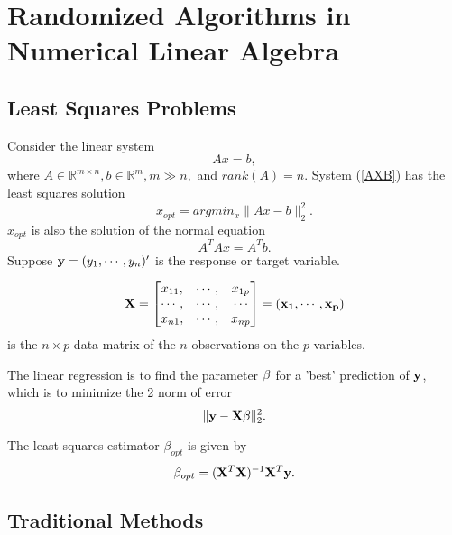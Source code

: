 \chapter{Randomized Algorithms in Numerical Linear Algebra}

\section{Least Squares Problems}
Consider the linear system
\begin{equation}\label{AXB}
A x =b ,
\end{equation}
where $A \in \mathbb{R}^{m \times n}, b \in \mathbb{R}^{m}, m \gg n, $  and $rank(A) = n$.
System (\ref{AXB}) has the least squares solution
\begin{equation}\label{OPT}
x_{opt} = argmin_{x} \| Ax -b\|_2^2 .
\end{equation}
$x_{opt}$ is also the solution of the normal equation
\begin{equation}\label{NOR}
A^T A x = A^T b.
\end{equation}
Suppose $\bold{y} = (y_1,\cdots,y_n)'$  is the response or target variable.

$$\bold{X} = \begin{bmatrix} x_{11} ,&\cdots,& x_{1p}\\
                                                \cdots,&\cdots,&\cdots \\
                                                x_{n1},&\cdots,&x_{np} \end{bmatrix}
                 = (\bold{x_1},\cdots,\bold{x_p})$$
is the $n \times p$ data matrix of the $n$ observations on the $p$ variables.

The linear regression is to find the parameter $\bold{\beta}$ for a 'best' prediction of $\bold{y}$, which is to minimize the 2 norm of error
$$\| \bold{y} - \bold{X} \bold{\beta} \|_2^2.$$

The least squares estimator $\beta_{opt}$ is given by
$$
\beta_{opt} = (\bold{X}^T \bold{X})^{-1} \bold{X}^T \bold{y}.
$$
\section{Traditional Methods}


